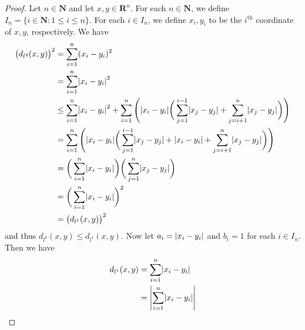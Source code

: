 \begin{proof}
    Let \(n \in \mathbf{N}\) and let \(x, y \in \mathbf{R}^n\).
    For each \(n \in \mathbf{N}\), we define \(I_n = \{i \in \mathbf{N} : 1 \leq i \leq n\}\).
    For each \(i \in I_n\), we define \(x_i, y_i\) to be the \(i^{\text{th}}\) coordinate of \(x, y\), respectively.
    We have
    \begin{align*}
        \big(d_{l^2}(x, y)\big)^2 & = \sum_{i = 1}^n (x_i - y_i)^2                                                                                                                                               \\
                                  & = \sum_{i = 1}^n \abs*{x_i - y_i}^2                                                                                                                                          \\
                                  & \leq \sum_{i = 1}^n \abs*{x_i - y_i}^2 + \sum_{i = 1}^n \Bigg(\abs*{x_i - y_i} \bigg(\sum_{j = 1}^{i - 1} \abs*{x_j - y_j} + \sum_{j = i + 1}^n \abs*{x_j - y_j}\bigg)\Bigg) \\
                                  & = \sum_{i = 1}^n \Bigg(\abs*{x_i - y_i} \bigg(\sum_{j = 1}^{i - 1} \abs*{x_j - y_j} + \abs*{x_i - y_i} + \sum_{j = i + 1}^n \abs*{x_j - y_j}\bigg)\Bigg)                     \\
                                  & = \bigg(\sum_{i = 1}^n \abs*{x_i - y_i}\bigg) \bigg(\sum_{j = 1}^n \abs*{x_j - y_j}\bigg)                                                                                    \\
                                  & = \bigg(\sum_{i = 1}^n \abs*{x_i - y_i}\bigg)^2                                                                                                                              \\
                                  & = \big(d_{l^1}(x, y)\big)^2
    \end{align*}
    and thus \(d_{l^2}(x, y) \leq d_{l^1}(x, y)\).
    Now let \(a_i = \abs*{x_i - y_i}\) and \(b_i = 1\) for each \(i \in I_n\).
    Then we have
    \begin{align*}
        d_{l^1}(x, y) & = \sum_{i = 1}^n \abs*{x_i - y_i}                                                                                                 \\
                      & = \abs*{\sum_{i = 1}^n \abs*{x_i - y_i}}                                                                                          \\

\end{align*}
\end{proof}
